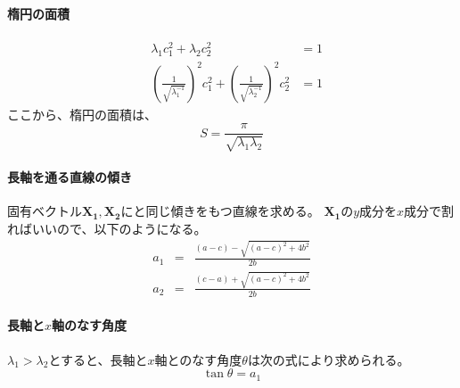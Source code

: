 \paragraph{楕円の面積}

\begin{eqnarray*}
 &\lambda_1c_1^2+\lambda_2c_2^2 &= 1 \\
 &\left(\frac{1}{\sqrt{\lambda_1^{-1}}}\right)^2c_1^2+\left(\frac{1}{\sqrt{\lambda_2^{-1}}}\right)^2c_2^2&=1
\end{eqnarray*}
ここから、楕円の面積は、
\begin{equation*}
 S = \frac{\pi}{\sqrt{\lambda_1\lambda_2}}
\end{equation*}


\paragraph{長軸を通る直線の傾き}
固有ベクトル$\bm{X_1},\bm{X_2}$にと同じ傾きをもつ直線を求める。
$\bm{X_1}$の$y$成分を$x$成分で割ればいいので、以下のようになる。
\begin{eqnarray*}
 a_1 &=& \frac{(a-c)-\sqrt{(a-c)^2+4b^2}}{2b} \\
 a_2 &=& \frac{(c-a)+\sqrt{(a-c)^2+4b^2}}{2b}
\end{eqnarray*}

\paragraph{長軸と$x$軸のなす角度}
$\lambda_1>\lambda_2$とすると、長軸と$x$軸とのなす角度$\theta$は次の式により求められる。
\begin{equation*}
 \tan \theta = a_1
\end{equation*}


